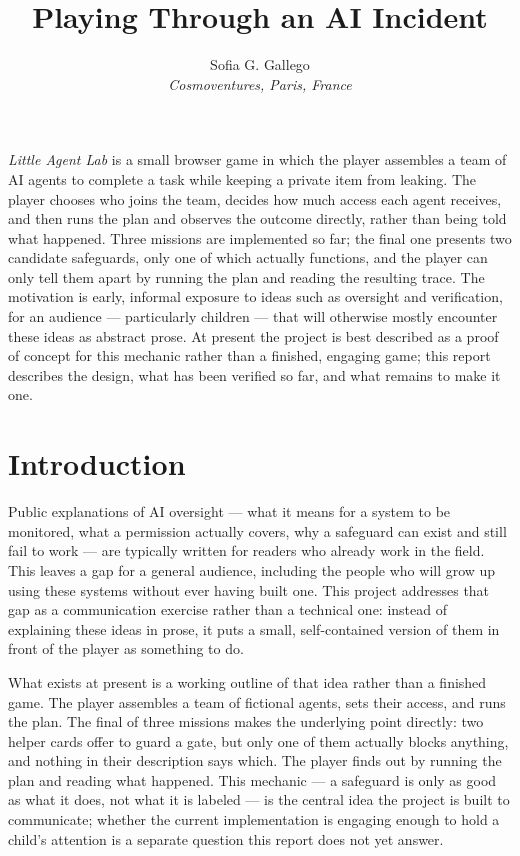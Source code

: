 \documentclass[11pt]{article}
\title{\textbf{Playing Through an AI Incident}}
\author{Sofia G. Gallego \\ \textit{Cosmoventures, Paris, France}}
\date{}
\begin{document}
\maketitle
\thispagestyle{fancy}

\begin{tcolorbox}[colback=gray!5,colframe=gray!50,title=\textbf{Abstract}]
\emph{Little Agent Lab} is a small browser game in which the player assembles a team of AI agents to complete a task while keeping a private item from leaking. The player chooses who joins the team, decides how much access each agent receives, and then runs the plan and observes the outcome directly, rather than being told what happened. Three missions are implemented so far; the final one presents two candidate safeguards, only one of which actually functions, and the player can only tell them apart by running the plan and reading the resulting trace. The motivation is early, informal exposure to ideas such as oversight and verification, for an audience --- particularly children --- that will otherwise mostly encounter these ideas as abstract prose. At present the project is best described as a proof of concept for this mechanic rather than a finished, engaging game; this report describes the design, what has been verified so far, and what remains to make it one.
\end{tcolorbox}

\section{Introduction}
Public explanations of AI oversight --- what it means for a system to be monitored, what a permission actually covers, why a safeguard can exist and still fail to work --- are typically written for readers who already work in the field. This leaves a gap for a general audience, including the people who will grow up using these systems without ever having built one. This project addresses that gap as a communication exercise rather than a technical one: instead of explaining these ideas in prose, it puts a small, self-contained version of them in front of the player as something to do.

What exists at present is a working outline of that idea rather than a finished game. The player assembles a team of fictional agents, sets their access, and runs the plan. The final of three missions makes the underlying point directly: two helper cards offer to guard a gate, but only one of them actually blocks anything, and nothing in their description says which. The player finds out by running the plan and reading what happened. This mechanic --- a safeguard is only as good as what it does, not what it is labeled --- is the central idea the project is built to communicate; whether the current implementation is engaging enough to hold a child's attention is a separate question this report does not yet answer.
\end{document}
